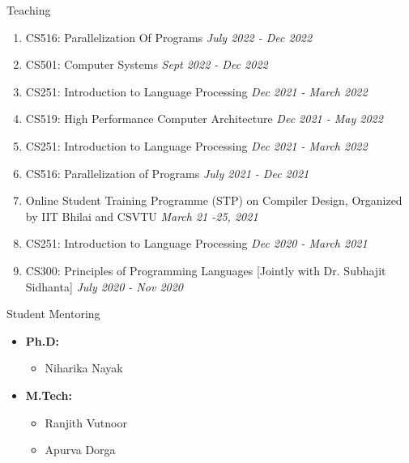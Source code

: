 \documentclass{resume} %
\begin{document}
\begin{rSection}{Teaching}
	\begin{enumerate}
		\item CS516: Parallelization Of Programs \hfill {\em July 2022 - Dec 2022}
		\item CS501: Computer Systems \hfill {\em Sept 2022 - Dec 2022}
		\item CS251: Introduction to Language Processing \hfill {\em Dec 2021 - March 2022}
		\item CS519: High Performance Computer Architecture  \hfill {\em Dec 2021 - May 2022}	
		\item CS251: Introduction to Language Processing \hfill {\em Dec 2021 - March 2022}
		\item CS516: Parallelization of Programs  \hfill {\em July 2021 - Dec 2021}	
		\item Online Student Training Programme (STP) on Compiler Design, Organized by IIT Bhilai and CSVTU  \hfill {\em March 21 -25, 2021}	
		\item CS251: Introduction to Language Processing \hfill {\em Dec 2020 - March 2021}
		\item CS300: Principles of Programming Languages [{\scriptsize Jointly with Dr. Subhajit Sidhanta}] \hfill {\em July 2020 - Nov 2020}
	\end{enumerate}
\end{rSection}


\begin{rSection}{Student Mentoring}
	\begin{itemize}
		\item \textbf{Ph.D:}
		\begin{itemize}
			\item Niharika Nayak
		\end{itemize}
		\item \textbf{M.Tech:}
		\begin{itemize}
			\item Ranjith Vutnoor
			\item Apurva Dorga
		\end{itemize}
	\end{itemize}
\end{rSection}

\end{document}

